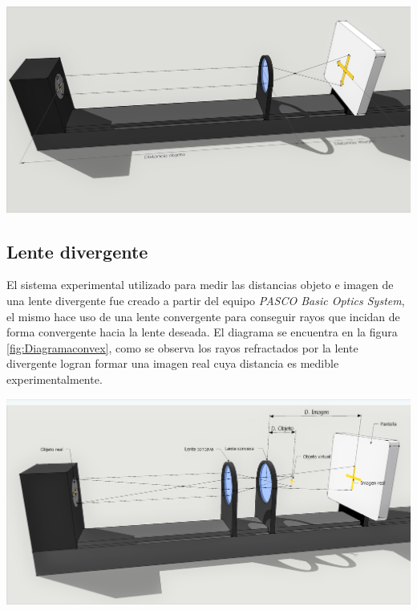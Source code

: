 \documentclass[a4paper,12pt]{article}
\newenvironment{Figure}
  {\par\medskip\noindent\minipage{\linewidth}}
  {\endminipage\par\medskip}
\begin{document}
\begin{multicols*}{2}
        \begin{Figure}
            \centering
            \includegraphics[width=1\linewidth]{LenteConvergente.jpg}
            \label{PASCOconv}
        \end{Figure}

    \subsection*{Lente divergente}

        El sistema experimental utilizado para medir las distancias objeto e imagen de una lente divergente fue creado a partir del equipo \emph{PASCO Basic Optics System}, el mismo hace uso de una lente convergente para conseguir rayos que incidan de forma convergente hacia la lente deseada. El diagrama se encuentra en la figura \ref{fig:Diagramaconvex}, como se observa los rayos refractados por la lente divergente logran formar una imagen real cuya distancia es medible experimentalmente.

        \begin{Figure}
            \centering
            \includegraphics[width=1\linewidth]{DLCX}
            \label{fig:Diagramaconvex}
        \end{Figure}


\end{multicols*}
\end{document}
